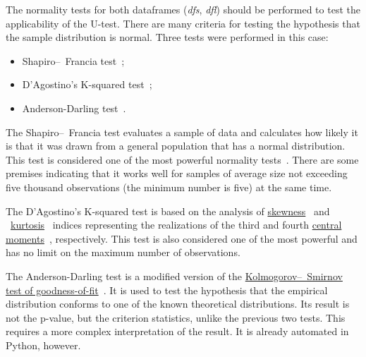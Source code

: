 \documentclass[]{scrreprt}
\begin{document}
The normality tests for both dataframes (\textit{dfs}, \textit{dfl}) should be performed to test the applicability of the U-test. There are many criteria for testing the hypothesis that the sample distribution is normal. Three tests were performed in this case:
\begin{itemize}
	\item Shapiro--~Francia test~\cite{Shapiro-Wilk-test};
	\item D'Agostino's K-squared test~\cite{Agostino-test};
	\item Anderson-Darling test~\cite{Anderson-Darling-test}.
\end{itemize}
The Shapiro--~Francia test evaluates a sample of data and calculates how likely it is that it was drawn from a general population that has a normal distribution. This test is considered one of the most powerful normality tests~\cite{Kobzarq-prikl-mathstat}. There are some premises indicating that it works well for samples of average size not exceeding five thousand observations (the minimum number is five) at the same time.

The D'Agostino's K-squared test is based on the analysis of \href{https://en.wikipedia.org/wiki/Skewness}{skewness}~\cite{Wiki:skewness} and ~\href{https://en.wikipedia.org/wiki/Kurtosis}{kurtosis}~\cite{Wiki:kurtosis} indices representing the realizations of the third and fourth \href{https://en.wikipedia.org/wiki/Central_moment}{central moments}~\cite{Wiki:central-moment}, respectively. This test is also considered one of the most powerful and has no limit on the maximum number of observations.

The Anderson-Darling test is a modified version of the \href{https://en.wikipedia.org/wiki/Kolmogorov_Smirnov_test}{Kolmogorov--~Smirnov test of goodness-of-fit}~\cite{Wiki:Kolmogorow-Smirnow-test}. It is used to test the hypothesis that the empirical distribution conforms to one of the known theoretical distributions. Its result is not the p-value, but the criterion statistics, unlike the previous two tests. This requires a more complex interpretation of the result. It is already automated in Python, however.
\end{document}
